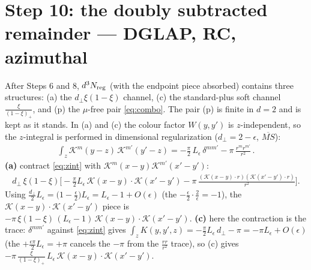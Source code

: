 \documentclass[9pt]{article}
\newcommand{\Leps}{L_{\epsilon}}
\newcommand{\KK}{\mathcal K(x-y)\!\cdot\!\mathcal K(x'-y')}
\begin{document}
\section{Step 10: the doubly subtracted remainder --- DGLAP, RC, azimuthal}
After Steps 6 and 8, $d^{3}N_{\rm reg}$ (with the endpoint piece absorbed) contains three
structures: (a) the $d_{\perp}\xi(1-\xi)$ channel, (c) the standard-plus soft channel
$\frac{\xi}{(1-\xi)_{+}}$, and (p) the $\mu$-free pair \eqref{eq:combo}. The pair (p) is
finite in $d=2$ and is kept as it stands. In (a) and (c) the colour factor $W(y,y')$ is
$z$-independent, so the $z$-integral is performed in dimensional regularization
($d_{\perp}=2-\epsilon$, $\overline{MS}$):
\begin{align}\label{eq:zint}
\int_{z}\mathcal K^{m}(y-z)\,\mathcal K^{m'}(y'-z)
=-\frac{\pi}{2}\,\Leps\,\delta^{mm'}-\pi\,\frac{r^{m}r^{m'}}{r^{2}}\,.
\end{align}
\textbf{(a)} contract \eqref{eq:zint} with $\mathcal K^{m}(x-y)\mathcal K^{m'}(x'-y')$:
\begin{align}
d_{\perp}\,\xi(1-\xi)\Big[-\frac{\pi}{2}\Leps\,\KK-\pi\,\frac{(\mathcal K(x-y)\cdot r)(\mathcal K(x'-y')\cdot r)}{r^{2}}\Big].
\end{align}
Using $\frac{d_{\perp}}{2}\Leps=\big(1-\frac{\epsilon}{2}\big)\Leps=\Leps-1+O(\epsilon)$
(the $-\frac{\epsilon}{2}\cdot\frac{2}{\epsilon}=-1$), the $\KK$ piece is
$-\pi\,\xi(1-\xi)\,(\Leps-1)\,\KK$.
\textbf{(c)} here the contraction is the trace: $\delta^{mm'}$ against \eqref{eq:zint} gives
$\int_{z}K(y,y',z)=-\frac{\pi}{2}\Leps\,d_{\perp}-\pi=-\pi\Leps+O(\epsilon)$ (the
$+\frac{\epsilon\pi}{2}\Leps=+\pi$ cancels the $-\pi$ from the $\frac{rr}{r^{2}}$ trace), so
(c) gives $-\pi\,\frac{\xi}{(1-\xi)_{+}}\,\Leps\,\KK$.
\end{document}
